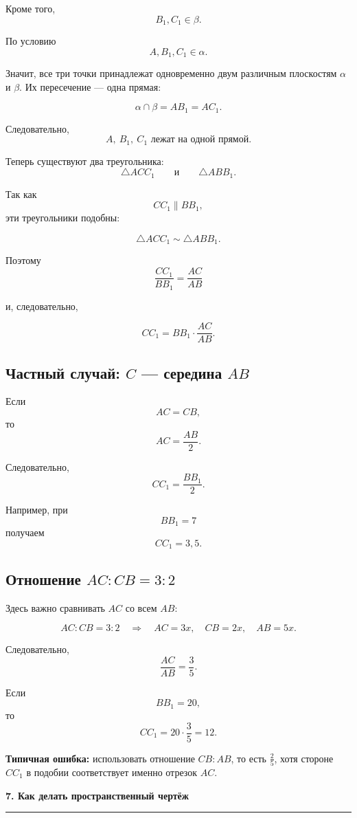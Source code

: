 \documentclass[a4paper,12pt]{article}
\newcommand{\lessonsection}[1]{%
  \vspace{0.4em}
  {\Large\bfseries\color{darkaccent}#1}\par
  \vspace{0.25em}
  {\color{lightaccent}\rule{\linewidth}{0.8pt}}
  \vspace{0.6em}
}
\newcommand{\key}[1]{\textbf{\color{darkaccent}#1}}
\begin{document}
Кроме того,
\[
B_1,C_1\in\beta.
\]

По условию
\[
A,B_1,C_1\in\alpha.
\]

Значит, все три точки принадлежат одновременно двум различным плоскостям
\(\alpha\) и \(\beta\). Их пересечение --- одна прямая:

\[
\alpha\cap\beta=AB_1=AC_1.
\]

Следовательно,
\[
\boxed{A,\ B_1,\ C_1\text{ лежат на одной прямой}.}
\]

Теперь существуют два треугольника:
\[
\triangle ACC_1
\qquad\text{и}\qquad
\triangle ABB_1.
\]

Так как
\[
CC_1\parallel BB_1,
\]
эти треугольники подобны:

\[
\triangle ACC_1\sim\triangle ABB_1.
\]

Поэтому
\[
\boxed{
\frac{CC_1}{BB_1}
=
\frac{AC}{AB}
}
\]

и, следовательно,

\[
\boxed{
CC_1=BB_1\cdot\frac{AC}{AB}
}.
\]

\subsection*{\color{darkaccent}Частный случай: \(C\) --- середина \(AB\)}

Если
\[
AC=CB,
\]
то
\[
AC=\frac{AB}{2}.
\]

Следовательно,
\[
CC_1=\frac{BB_1}{2}.
\]

Например, при
\[
BB_1=7
\]
получаем
\[
\boxed{CC_1=3{,}5}.
\]

\subsection*{\color{darkaccent}Отношение \(AC:CB=3:2\)}

Здесь важно сравнивать \(AC\) со всем \(AB\):

\[
AC:CB=3:2
\quad\Longrightarrow\quad
AC=3x,\quad CB=2x,\quad AB=5x.
\]

Следовательно,
\[
\frac{AC}{AB}=\frac35.
\]

Если
\[
BB_1=20,
\]
то
\[
CC_1
=
20\cdot\frac35
=
\boxed{12}.
\]

\key{Типичная ошибка:}
использовать отношение \(CB:AB\), то есть \(\frac25\), хотя стороне
\(CC_1\) в подобии соответствует именно отрезок \(AC\).

\lessonsection{7. Как делать пространственный чертёж}
\end{document}
